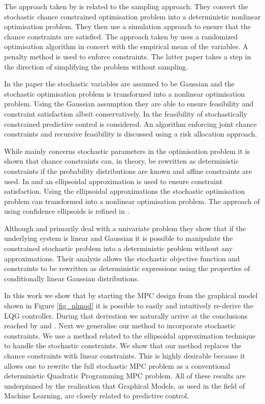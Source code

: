 The approach taken by \cite{li} is related to the sampling approach. They convert the stochastic chance constrained optimisation problem into a deterministic nonlinear optimisation problem. They then use a simulation approach to ensure that the chance constraints are satisfied. The approach taken by \cite{batina} uses a randomized optimisation algorithm in concert with the empirical mean of the variables. A penalty method is used to enforce constraints. The latter paper takes a step in the direction of simplifying the problem without sampling. 

In the paper \cite{li2} the stochastic variables are assumed to be Gaussian and the stochastic optimisation problem is transformed into a nonlinear optimisation problem. Using the Gaussian assumption they are able to ensure feasibility and constraint satisfaction albeit conservatively. In \cite{masahiro} the feasibility of stochastically constrained predictive control is considered. An algorithm enforcing joint chance constraints and recursive feasibility is discussed using a risk allocation approach.

While \cite{schwarm} mainly concerns stochastic parameters in the optimisation problem it is shown that chance constraints can, in theory, be rewritten as deterministic constraints if the probability distributions are known and affine constraints are used. In \cite{vanhessem1} and \cite{vanhessem2} an ellipsoidal approximation is used to ensure constraint satisfaction. Using the ellipsoidal approximations the stochastic optimisation problem can transformed into a nonlinear optimisation problem. The approach of using confidence ellipsoids is refined in \cite{cannon}.

Although \cite{yan1} and \cite{yan2} primarily deal with a univariate problem they show that if the underlying system is linear and Gaussian it is possible to manipulate the constrained stochastic problem into a deterministic problem without any approximations. Their analysis allows the stochastic objective function and constraints to be rewritten as deterministic expressions using the properties of conditionally linear Gaussian distributions.

In this work we show that by starting the MPC design from the graphical model shown in Figure \ref{fig_nlmod} it is possible to easily and intuitively re-derive the LQG controller. During that derivation we naturally arrive at the conclusions reached by \cite{yan1} and \cite{yan2}. Next we generalise our method to incorporate stochastic constraints. We use a method related to the ellipsoidal approximation technique to handle the stochastic constraints. We show that our method replaces the chance constraints with linear constraints. This is highly desirable because it allows one to rewrite the full stochastic MPC problem as a conventional deterministic Quadratic Programming MPC problem. All of these results are underpinned by the realisation that Graphical Models, as used in the field of Machine Learning, are closely related to predictive control. 

